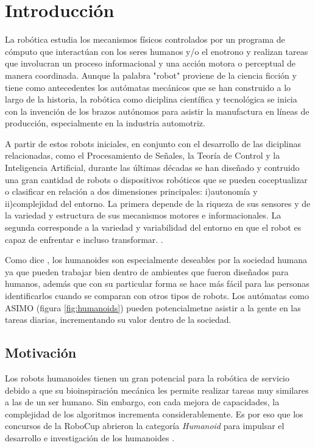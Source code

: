 \chapter{Introducción}
	La robótica estudia los mecanismos físicos controlados por un programa de cómputo que interactúan con los seres humanos y/o el enotrono y realizan tareas que involucran un proceso informacional y una acción motora o perceptual de manera coordinada. Aunque la palabra "robot" proviene de la ciencia ficción y tiene como antecedentes los autómatas mecánicos que se han construido a lo largo de la historia, la robótica como diciplina científica y tecnológica se inicia con la invención de los brazos autónomos para asistir la manufactura en líneas de producción, especialmente en la industria automotriz.
	
	A partir de estos robots iniciales, en conjunto con el desarrollo de las diciplinas relacionadas, como el Procesamiento de Señales,  la Teoría de Control y la Inteligencia Artificial, durante las últimas décadas se han diseñado y contruido una gran cantidad de robots o dispositivos robóticos que se pueden coceptualizar o clasificar en relación a dos dimensiones principales: i)autonomía y ii)complejidad del entorno. La primera depende de la riqueza de sus sensores y de la variedad y estructura de sus mecanismos motores e informacionales. La segunda corresponde a la variedad y variabilidad del entorno en que el robot es capaz de enfrentar e incluso transformar. \cite{pineda2017computacion}.
	
	Como dice \cite{sakagami2002intelligent}, los humanoides son especialmente deseables por la sociedad humana ya que pueden trabajar bien dentro de ambientes que fueron diseñados para humanos, además que con su particular forma se hace más fácil para las personas identificarlos cuando se comparan con otros tipos de robots. Los autómatas como ASIMO (figura \ref{fig:humanoids}) pueden potencialmetne asistir a la gente en las tareas diarias, incrementando su valor dentro de la sociedad.
	
\section{Motivación}
	Los robots humanoides tienen un gran potencial para la robótica de servicio debido a que su bioinspiración mecánica les permite realizar tareas muy similares a las de un ser humano. Sin embargo, con cada mejora de capacidades, la complejidad de los algoritmos incrementa considerablemente. Es por eso que los concursos de la RoboCup abrieron la categoría \textit{Humanoid} para impulsar el desarrollo e investigación de los humanoides \citep{kitano1998robocup}.
	
